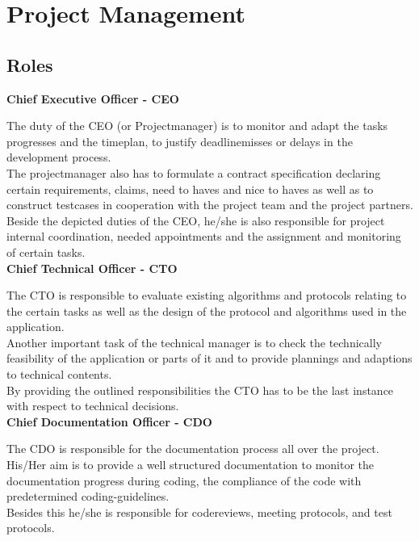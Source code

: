 
\section{Project Management}

\subsection{Roles}

\textbf{Chief Executive Officer - CEO}

The duty of the CEO (or Projectmanager) is to monitor and adapt the tasks progresses and the timeplan, 
to justify deadlinemisses or delays in the development process.\\

The projectmanager also has to formulate a contract specification declaring certain requirements, 
claims, need to haves and nice to haves as well as to construct testcases in cooperation with the project 
team and the project partners.\\

Beside the depicted duties of the CEO, he/she is also responsible for project internal coordination, 
needed appointments and the assignment and monitoring of certain tasks.\\

\textbf{Chief Technical Officer - CTO}

The CTO is responsible to evaluate existing algorithms and protocols relating to the certain 
tasks as well as the design of the protocol and algorithms used in the application.\\

Another important task of the technical manager is to check the technically feasibility 
of the application or parts of it and to provide plannings and adaptions to technical contents.\\

By providing the outlined responsibilities the CTO has to be the last instance with respect to technical decisions.\\


\textbf{Chief Documentation Officer - CDO}

The CDO is responsible for the documentation process all over the project. 
His/Her aim is to provide a well structured documentation to monitor the documentation progress during coding, 
the compliance of the code with predetermined coding-guidelines.\\

Besides this he/she is responsible for codereviews, meeting protocols, and test protocols.\\

